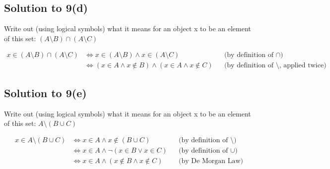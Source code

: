 \documentclass{scrartcl}
\begin{document}
    \subsection*{Solution to 9(d)}
        Write out (using logical symbols) what it means for an object x to be an element of this set: $(A \setminus B) \cap (A \setminus C)$

        \begin{align*}
            x \in (A \setminus B) \cap (A \setminus C)
            &\Leftrightarrow x \in (A \setminus B) \wedge x \in (A \setminus C)
            && \text{(by definition of $\cap$)} \\
            &\Leftrightarrow (x \in A \wedge x \notin B) \wedge (x \in A \wedge x \notin C)
            && \text{(by definition of $\setminus$, applied twice)}
        \end{align*}

    \subsection*{Solution to 9(e)}
        Write out (using logical symbols) what it means for an object x to be an element of this set: $A \setminus (B \cup C)$

        \begin{align*}
            x \in A \setminus (B \cup C)
            &\Leftrightarrow x \in A \wedge x \notin (B \cup C)
            && \text{(by definition of $\setminus$)} \\
            &\Leftrightarrow x \in A \wedge \neg (x \in B \vee x \in C)
            && \text{(by definition of $\cup$)} \\
            &\Leftrightarrow x \in A \wedge (x \notin B \wedge x \notin C)
            && \text{(by De Morgan Law)} \\
        \end{align*}
\end{document}
